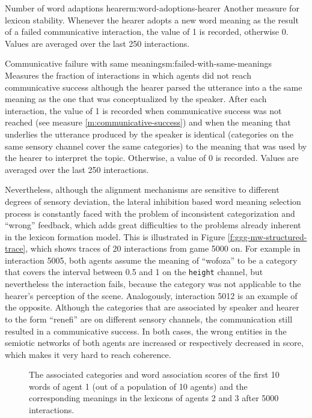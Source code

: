 \begin{measure}[b]{Number of word adaptions
    hearer}{m:word-adoptions-hearer}
  Another measure for lexicon stability. Whenever the hearer adopts a
  new word meaning as the result of a failed communicative
  interaction, the value of 1 is recorded, otherwise 0. Values are
  averaged over the last 250 interactions.
\end{measure}

\begin{measure}[b]{Communicative failure with same
    meanings}{m:failed-with-same-meanings}
  Measures the fraction of interactions in which agents did not reach
  communicative success although the hearer parsed the utterance into
  a the same meaning as the one that was conceptualized by the
  speaker. After each interaction, the value of 1 is recorded when
  communicative success was not reached (see measure
  \ref{m:communicative-success}) and when the meaning that underlies
  the utterance produced by the speaker is identical (categories on
  the same sensory channel cover the same categories) to the meaning
  that was used by the hearer to interpret the topic. Otherwise, a
  value of 0 is recorded. Values are averaged over the last 250
  interactions.
\end{measure}


Nevertheless, although the alignment mechanisms are sensitive to
different degrees of sensory deviation, the lateral inhibition based
word meaning selection process is constantly faced with the problem of
inconsistent categorization and ``wrong'' feedback, which adds great
difficulties to the problems already inherent in the lexicon formation
model. This is illustrated in Figure \ref{f:ggg-mw-structured-trace},
which shows traces of 20 interactions from game 5000 on. For example
in interaction 5005, both agents assume the meaning of ``wofoza'' to
be a category that covers the interval between 0.5 and 1 on the
\texttt{height} channel, but nevertheless the interaction fails,
because the category was not applicable to the hearer's perception of
the scene. Analogously, interaction 5012 is an example of the
opposite. Although the categories that are associated by speaker and
hearer to the form ``renefi'' are on different sensory channels, the
communication still resulted in a communicative success. In both
cases, the wrong entities in the semiotic networks of both agents are
increased or respectively decreased in score, which makes it very hard
to reach coherence.


\begin{figure}[t]
  \caption{The associated categories and word association scores of
    the first 10 words of agent 1 (out of a population of 10 agents)
    and the corresponding meanings in the lexicons of agents 2 and 3
    after 5000 interactions. }
  \label{f:ggg-mw-structured-lexicon-forms-5000}
\end{figure}



